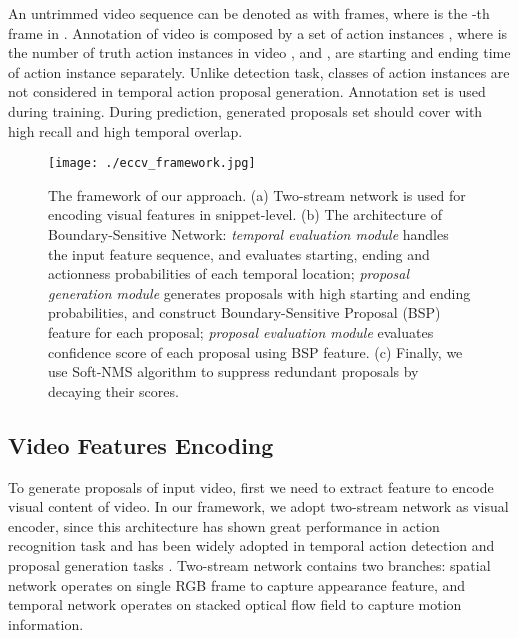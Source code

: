 \documentclass[runningheads]{llncs}
\begin{document}
An untrimmed video sequence can be denoted as  with   frames, where  is the -th frame in .
Annotation of video  is composed by a set of action instances , where  is the number of truth action instances in video  , and ,  are starting and ending time of action instance  separately.
Unlike  detection task, classes of action instances are not considered in temporal action proposal generation.
Annotation set  is used during training. During prediction, generated proposals set  should cover  with high recall and high temporal overlap.

\begin{figure*}\setlength{\abovecaptionskip}{-0.4cm} \setlength{\belowcaptionskip}{-0.5cm} \begin{center}
\begin{minipage}[b]{1.0\linewidth}
  \centering
  \centerline{\texttt{[image: ./eccv\_framework.jpg]}}
\medskip
\end{minipage}
\end{center}
   \caption{The framework of our approach. (a) Two-stream network is used for encoding visual features in snippet-level. (b) The architecture of Boundary-Sensitive Network: \emph{temporal evaluation module} handles the input feature sequence, and evaluates starting, ending  and actionness probabilities of each temporal location; \emph{proposal generation module} generates proposals with high starting and ending probabilities, and construct Boundary-Sensitive Proposal (BSP) feature for each proposal; \emph{proposal evaluation module} evaluates confidence score of each proposal using BSP feature. (c) Finally, we use Soft-NMS algorithm  to suppress redundant proposals by decaying their scores. }
\label{fig_framework}
\end{figure*}

\subsection{Video Features Encoding}

To generate proposals of input video, first we need to extract feature to encode visual content of video. 
In our framework, we adopt two-stream network \cite{simonyan2014two} as visual encoder, since this architecture has shown great performance in action recognition task \cite{wang2016temporal} and has been widely adopted in temporal action detection and proposal generation tasks \cite{zhao2017temporal,ssad,gao2017cascaded}.
Two-stream network contains two branches: spatial network  operates on single RGB frame to capture appearance feature, and temporal network operates on stacked optical flow field to capture motion information.
\end{document}
